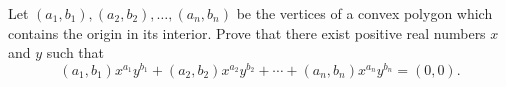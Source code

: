 Let $(a_1, b_1), (a_2, b_2), \ldots, (a_n, b_n)$ be the vertices of a
convex polygon which contains the origin in its interior. Prove that
there exist positive real numbers $x$ and $y$ such that
\[
(a_1, b_1)x^{a_1} y^{b_1} + (a_2, b_2)x^{a_2}y^{b_2} + \cdots + (a_n, b_n)x^{a_n}y^{b_n} = (0,0).
\]

